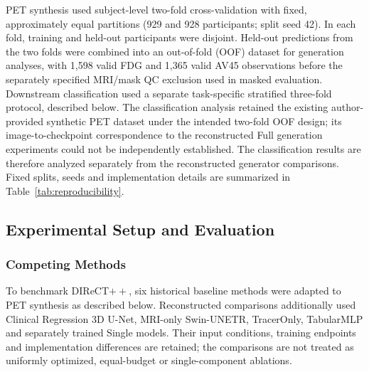 \documentclass{article}
\begin{document}
PET synthesis used subject-level two-fold cross-validation with fixed, approximately equal partitions (929 and 928 participants; split seed 42). In each fold, training and held-out participants were disjoint. Held-out predictions from the two folds were combined into an out-of-fold (OOF) dataset for generation analyses, with 1,598 valid FDG and 1,365 valid AV45 observations before the separately specified MRI/mask QC exclusion used in masked evaluation. Downstream classification used a separate task-specific stratified three-fold protocol, described below. The classification analysis retained the existing author-provided synthetic PET dataset under the intended two-fold OOF design; its image-to-checkpoint correspondence to the reconstructed Full generation experiments could not be independently established. The classification results are therefore analyzed separately from the reconstructed generator comparisons. Fixed splits, seeds and implementation details are summarized in Table~\ref{tab:reproducibility}.

\subsection{Experimental Setup and Evaluation}
\subsubsection{Competing Methods}
To benchmark DIReCT$++$, six historical baseline methods were adapted to PET synthesis as described below. Reconstructed comparisons additionally used Clinical Regression 3D U-Net, MRI-only Swin-UNETR, TracerOnly, TabularMLP and separately trained Single models. Their input conditions, training endpoints and implementation differences are retained; the comparisons are not treated as uniformly optimized, equal-budget or single-component ablations.
\end{document}
